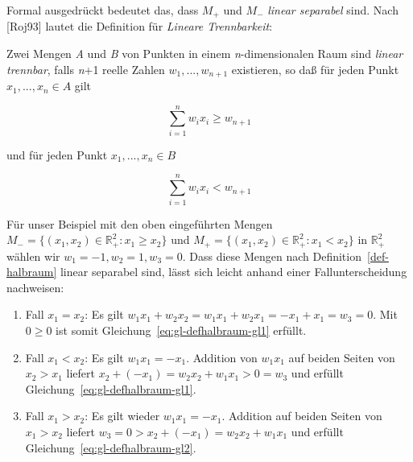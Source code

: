 Formal ausgedrückt bedeutet das, dass $M_+$ und $M_-$ \textit{linear separabel} sind. Nach [Roj93] lautet die Definition für \textit{Lineare Trennbarkeit}:

\begin{definition}\footnotemark[21]

Zwei Mengen \textit{A} und \textit{B} von Punkten in einem \textit{n}-dimensionalen Raum sind \textit{linear trennbar}, falls \textit{n}+1 reelle Zahlen $w_1, ... , w_{n+1}$ existieren, so daß für jeden Punkt $x_1, ... , x_n \in A$ gilt

\begin{equation}
\sum^n_{i=1} w_ix_i \geq w_{n+1}
\label{eq:gl-defhalbraum-gl1}
\end{equation}

und für jeden Punkt $x_1, ... , x_n \in B$

\begin{equation}
    \sum^n_{i=1} w_ix_i < w_{n+1}
\label{eq:gl-defhalbraum-gl2}
\end{equation}
\label{def-halbraum}
\end{definition}



\noindent
Für unser Beispiel mit den oben eingeführten Mengen $M_- = \{(x_1, x_2) \in  \mathbb{R}_+^2: x_1 \geq x_2\}$ und $M_+=\{(x_1, x_2) \in  \mathbb{R}_+^2: x_1 < x_2\}$ in $ \mathbb{R}_+^2$ wählen wir $w_1 = -1, w_2 = 1, w_3 = 0$.
Dass diese Mengen nach Definition~\ref{def-halbraum} linear separabel sind, lässt sich leicht anhand einer Fallunterscheidung nachweisen:

\begin{enumerate}
    \item Fall $x_1 = x_2$: Es gilt $w_1x_1 + w_2x_2 = w_1x_1 + w_2x_1 = -x_1 + x_1 = w_3 = 0$. Mit $0 \geq 0$ ist somit Gleichung~\ref{eq:gl-defhalbraum-gl1} erfüllt.
    \item Fall $x_1 < x_2$: Es gilt $w_1x_1 = -x_1$. Addition von $w_1x_1$ auf beiden Seiten von $x_2 > x_1$ liefert $x_2 + (-x_1) = w_2x_2 + w_1x_1 > 0 = w_3$ und erfüllt Gleichung~\ref{eq:gl-defhalbraum-gl1}.
    \item Fall $x_1 > x_2$: Es gilt wieder $w_1x_1 = -x_1$. Addition auf beiden Seiten von $x_1 > x_2$ liefert $w_3 = 0 > x_2 + (-x_1) = w_2x_2 + w_1x_1$ und erfüllt Gleichung~\ref{eq:gl-defhalbraum-gl2}.
\end{enumerate}



